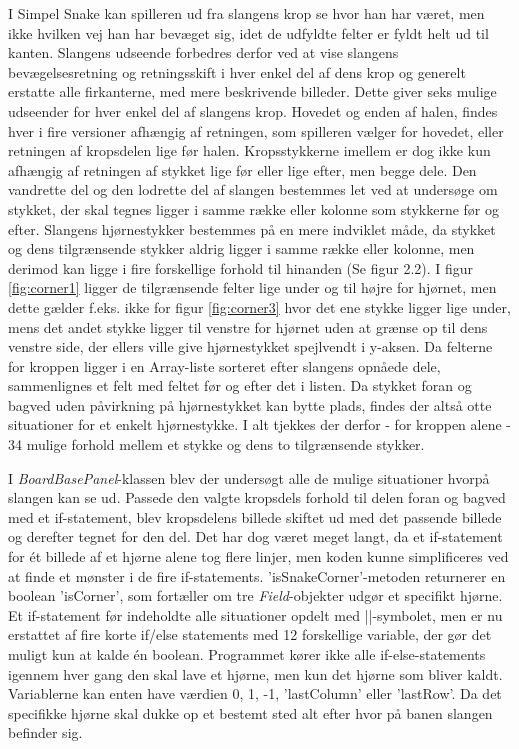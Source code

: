I Simpel Snake kan spilleren ud fra slangens krop se hvor han har været, men ikke hvilken vej han har bevæget sig, idet de udfyldte felter er fyldt helt ud til kanten. Slangens udseende forbedres derfor ved at vise slangens bevægelsesretning og retningsskift i hver enkel del af dens krop og generelt erstatte alle firkanterne, med mere beskrivende billeder. Dette giver seks mulige udseender for hver enkel del af slangens krop. Hovedet og enden af halen, findes hver i fire versioner afhængig af retningen, som spilleren vælger for hovedet, eller retningen af kropsdelen lige før halen. Kropsstykkerne imellem er dog ikke kun afhængig af retningen af stykket lige før eller lige efter, men begge dele. Den vandrette del og den lodrette del af slangen bestemmes let ved at undersøge om stykket, der skal tegnes ligger i samme række eller kolonne som stykkerne før og efter. Slangens hjørnestykker bestemmes på en mere indviklet måde, da stykket og dens tilgrænsende stykker aldrig ligger i samme række eller kolonne, men derimod kan ligge i fire forskellige forhold til hinanden (Se figur 2.2). I figur \ref{fig:corner1} ligger de tilgrænsende felter lige under og til højre for hjørnet, men dette gælder f.eks. ikke for figur \ref{fig:corner3} hvor det ene stykke ligger lige under, mens det andet stykke ligger til venstre for hjørnet uden at grænse op til dens venstre side, der ellers ville give hjørnestykket spejlvendt i y-aksen. Da felterne for kroppen ligger i en Array-liste sorteret efter slangens opnåede dele, sammenlignes et felt med feltet før og efter det i listen. Da stykket foran og bagved uden påvirkning på hjørnestykket kan bytte plads, findes der altså otte situationer for et enkelt hjørnestykke. I alt tjekkes der derfor - for kroppen alene - 34 mulige forhold mellem et stykke og dens to tilgrænsende stykker.
\linebreak

I \textit{BoardBasePanel}-klassen blev der undersøgt alle de mulige situationer hvorpå slangen kan se ud. Passede den valgte kropsdels forhold til delen foran og bagved med et if-statement, blev kropsdelens billede skiftet ud med det passende billede og derefter tegnet for den del. Det har dog været meget langt, da et if-statement for ét billede af et hjørne alene tog flere linjer, men koden kunne simplificeres ved at finde et mønster i de fire if-statements. 
'isSnakeCorner'-metoden returnerer en boolean 'isCorner', som fortæller om tre \textit{Field}-objekter udgør et specifikt hjørne. Et if-statement før indeholdte alle situationer opdelt med ||-symbolet, men er nu erstattet af fire korte if/else statements med 12 forskellige variable, der gør det muligt kun at kalde én boolean. Programmet kører ikke alle if-else-statements igennem hver gang den skal lave et hjørne, men kun det hjørne som bliver kaldt. Variablerne kan enten have værdien 0, 1, -1, 'lastColumn' eller 'lastRow'. Da det specifikke hjørne skal dukke op et bestemt sted alt efter hvor på banen slangen befinder sig.
\linebreak

